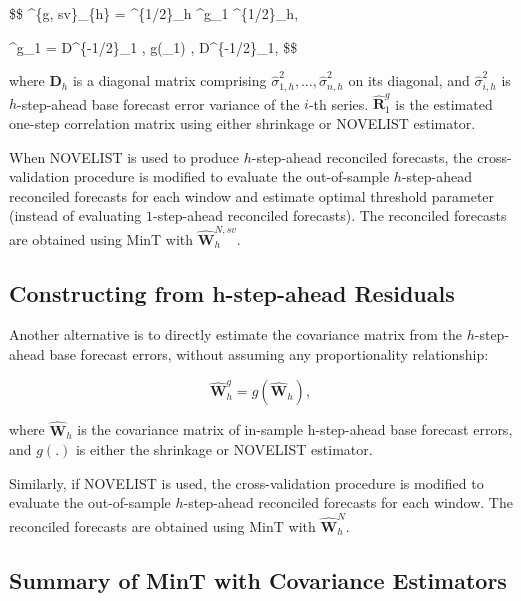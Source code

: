 \documentclass[
  11pt,
  letterpaper,
  DIV=11,
  numbers=noendperiod,
  titlepage]{scrartcl}
\begin{document}
\$\$ \^{}\{g, sv\}\_\{h\} =
\^{}\{1/2\}\_h \^{}g\_1
\^{}\{1/2\}\_h, \quad

\^{}g\_1 = D\^{}\{-1/2\}\_1 ,
g(\_1) , D\^{}\{-1/2\}\_1, \$\$

where \(\boldsymbol{D}_h\) is a diagonal matrix comprising
\(\hat{\sigma}^2_{1,h} , \ldots, \hat{\sigma}^2_{n,h}\) on its diagonal,
and \(\hat{\sigma}^2_{i,h}\) is \(h\)-step-ahead base forecast error
variance of the \(i\)-th series. \(\hat{\boldsymbol{R}}^g_1\) is the
estimated one-step correlation matrix using either shrinkage or NOVELIST
estimator.

When NOVELIST is used to produce \(h\)-step-ahead reconciled forecasts,
the cross-validation procedure is modified to evaluate the out-of-sample
\(h\)-step-ahead reconciled forecasts for each window and estimate
optimal threshold parameter (instead of evaluating \(1\)-step-ahead
reconciled forecasts). The reconciled forecasts are obtained using MinT
with \(\hat{\boldsymbol{W}}^{N, sv}_{h}\).

\subsection{Constructing from h-step-ahead
Residuals}\label{constructing-from-h-step-ahead-residuals}

Another alternative is to directly estimate the covariance matrix from
the \(h\)-step-ahead base forecast errors, without assuming any
proportionality relationship:

\[
\hat{\boldsymbol{W}}^{g}_{h} = g(\hat{\boldsymbol{W}}_h),
\]

where \(\hat{\boldsymbol{W}}_h\) is the covariance matrix of in-sample
h-step-ahead base forecast errors, and \(g(.)\) is either the shrinkage
or NOVELIST estimator.

Similarly, if NOVELIST is used, the cross-validation procedure is
modified to evaluate the out-of-sample \(h\)-step-ahead reconciled
forecasts for each window. The reconciled forecasts are obtained using
MinT with \(\hat{\boldsymbol{W}}^{N}_{h}\).

\subsection*{Summary of MinT with Covariance
Estimators}\label{summary-of-mint-with-covariance-estimators}
\end{document}
